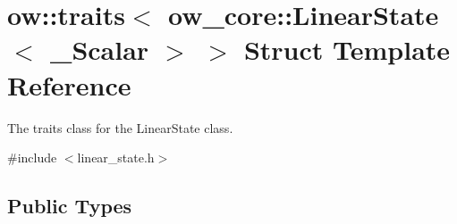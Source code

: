 \hypertarget{structow_1_1traits_3_01ow__core_1_1LinearState_3_01__Scalar_01_4_01_4}{}\section{ow\+:\+:traits$<$ ow\+\_\+core\+:\+:Linear\+State$<$ \+\_\+\+Scalar $>$ $>$ Struct Template Reference}
\label{structow_1_1traits_3_01ow__core_1_1LinearState_3_01__Scalar_01_4_01_4}


The traits class for the Linear\+State class.  




{\ttfamily \#include $<$linear\+\_\+state.\+h$>$}

\subsection*{Public Types}

